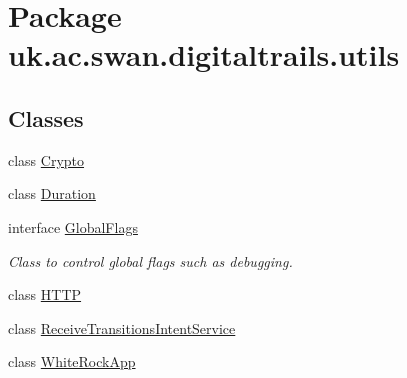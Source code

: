 \hypertarget{namespaceuk_1_1ac_1_1swan_1_1digitaltrails_1_1utils}{\section{Package uk.\+ac.\+swan.\+digitaltrails.\+utils}
\label{namespaceuk_1_1ac_1_1swan_1_1digitaltrails_1_1utils}
}
\subsection*{Classes}
\begin{DoxyCompactItemize}
\item 
class \hyperlink{classuk_1_1ac_1_1swan_1_1digitaltrails_1_1utils_1_1_crypto}{Crypto}
\item 
class \hyperlink{classuk_1_1ac_1_1swan_1_1digitaltrails_1_1utils_1_1_duration}{Duration}
\item 
interface \hyperlink{interfaceuk_1_1ac_1_1swan_1_1digitaltrails_1_1utils_1_1_global_flags}{Global\+Flags}
\begin{DoxyCompactList}\small\item\em Class to control global flags such as debugging. \end{DoxyCompactList}\item 
class \hyperlink{classuk_1_1ac_1_1swan_1_1digitaltrails_1_1utils_1_1_h_t_t_p}{H\+T\+T\+P}
\item 
class \hyperlink{classuk_1_1ac_1_1swan_1_1digitaltrails_1_1utils_1_1_receive_transitions_intent_service}{Receive\+Transitions\+Intent\+Service}
\item 
class \hyperlink{classuk_1_1ac_1_1swan_1_1digitaltrails_1_1utils_1_1_white_rock_app}{White\+Rock\+App}
\end{DoxyCompactItemize}
